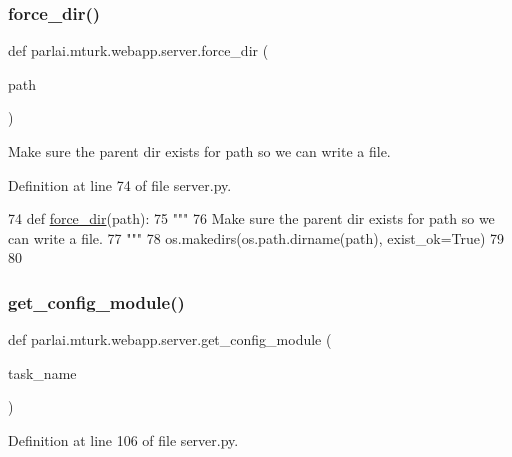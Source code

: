\subsubsection{\texorpdfstring{force\+\_\+dir()}{force\_dir()}}
{\footnotesize\ttfamily def parlai.\+mturk.\+webapp.\+server.\+force\+\_\+dir (\begin{DoxyParamCaption}\item[{}]{path }\end{DoxyParamCaption})}

\begin{DoxyVerb}Make sure the parent dir exists for path so we can write a file.
\end{DoxyVerb}
 

Definition at line 74 of file server.\+py.


\begin{DoxyCode}
74 \textcolor{keyword}{def }\hyperlink{namespaceparlai_1_1mturk_1_1webapp_1_1server_a493aeecfa7d5201aa13a7f03cdbc59cf}{force\_dir}(path):
75     \textcolor{stringliteral}{"""}
76 \textcolor{stringliteral}{    Make sure the parent dir exists for path so we can write a file.}
77 \textcolor{stringliteral}{    """}
78     os.makedirs(os.path.dirname(path), exist\_ok=\textcolor{keyword}{True})
79 
80 
\end{DoxyCode}
\mbox{\label{namespaceparlai_1_1mturk_1_1webapp_1_1server_aee065cfdb6346d4815762ae793427f1e}} 
\subsubsection{\texorpdfstring{get\+\_\+config\+\_\+module()}{get\_config\_module()}}
{\footnotesize\ttfamily def parlai.\+mturk.\+webapp.\+server.\+get\+\_\+config\+\_\+module (\begin{DoxyParamCaption}\item[{}]{task\+\_\+name }\end{DoxyParamCaption})}



Definition at line 106 of file server.\+py.


